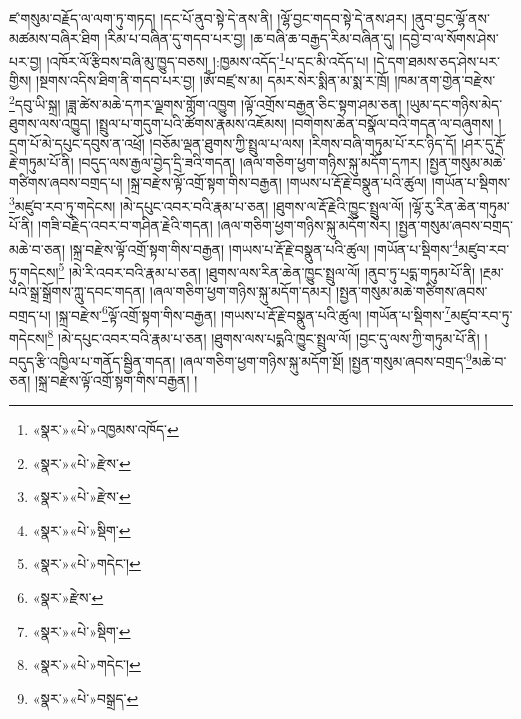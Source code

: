 ཛ་གསུམ་བརྗོད་ལ་ལག་ཏུ་གཏད། །དང་པོ་ནུབ་སྟེ་དེ་ནས་ནི། །ལྷོ་བྱང་གདབ་སྟེ་དེ་ནས་ཤར། །ནུབ་བྱང་ལྷོ་ནས་མཚམས་བཞིར་ཐིག །རིམ་པ་བཞིན་དུ་གདབ་པར་བྱ། །ཆ་བཞི་ཆ་བརྒྱད་རིམ་བཞིན་དུ། །དབྱེ་བ་ལ་སོགས་ཤེས་པར་བྱ། །འཁོར་ལོ་རྩིབས་བཞི་མུ་ཁྱུད་བཅས། །:ཁྱམས་འདོད་\footnote{«སྣར་»«པེ་»འཁྱམས་འཁོད་}པ་དང་མི་འདོད་པ། །དེ་དག་ཐམས་ཅད་ཤེས་པར་གྱིས། །སྔགས་འདིས་ཐིག་ནི་གདབ་པར་བྱ། །ཨོཾ་བཛྲ་ས་མ། དམར་སེར་སྨིན་མ་སྨ་ར་ཁྲོ། །ཁམ་ནག་གྱེན་བརྫེས་\footnote{«སྣར་»«པེ་»རྫེས་}དབུ་ཡི་སྐྲ། །ཟླ་ཚེས་མཆེ་དཀར་ལྗགས་གློག་འཁྱུག །ལྟོ་འགྲོས་བརྒྱན་ཅིང་སྟག་ཤམ་ཅན། །ཡུམ་དང་གཉིས་མེད་ཐུགས་ལས་འཁྱུད། །སྤྲུལ་པ་གདུག་པའི་ཚོགས་རྣམས་འཇོམས། །བགེགས་ཆེན་བསྣོལ་བའི་གདན་ལ་བཞུགས། །དྲག་པོ་མེ་དཔུང་དབུས་ན་འཕྲོ། །བཅོམ་ལྡན་ཐུགས་ཀྱི་སྤྲུལ་པ་ལས། །རིགས་བཞི་གཏུམ་པོ་རང་ཉིད་དོ། །ཤར་དུ་རྡོ་རྗེ་གཏུམ་པོ་ནི། །བདུད་ལས་རྒྱལ་བྱེད་དྲི་ཟའི་གདན། །ཞལ་གཅིག་ཕྱག་གཉིས་སྐུ་མདོག་དཀར། །སྤྱན་གསུམ་མཆེ་གཙིགས་ཞབས་བགྲད་པ། །སྐྲ་བརྫེས་ལྟོ་འགྲོ་སྟག་གིས་བརྒྱན། །གཡས་པ་རྡོ་རྗེ་བསྣུན་པའི་ཚུལ། །གཡོན་པ་སྡིགས་\footnote{«སྣར་»«པེ་»རྫེས་}མཛུབ་རབ་ཏུ་གདེངས། །མེ་དཔུང་འབར་བའི་རྣམ་པ་ཅན། །ཐུགས་ལ་རྡོ་རྗེའི་ཁྱུང་སྤྲུལ་ལོ། །ལྷོ་རུ་རིན་ཆེན་གཏུམ་པོ་ནི། །གཟི་བརྗིད་འབར་བ་གཤིན་རྗེའི་གདན། །ཞལ་གཅིག་ཕྱག་གཉིས་སྐུ་མདོག་སེར། །སྤྱན་གསུམ་ཞབས་བགྲད་མཆེ་བ་ཅན། །སྐྲ་བརྫེས་ལྟོ་འགྲོ་སྟག་གིས་བརྒྱན། །གཡས་པ་རྡོ་རྗེ་བསྣུན་པའི་ཚུལ། །གཡོན་པ་སྡིགས་\footnote{«སྣར་»«པེ་»སྡིག་}མཛུབ་རབ་ཏུ་གདེངས།\footnote{«སྣར་»«པེ་»གདེང་།} །མེ་རི་འབར་བའི་རྣམ་པ་ཅན། །ཐུགས་ལས་རིན་ཆེན་ཁྱུང་སྤྲུལ་ལོ། །ནུབ་ཏུ་པདྨ་གཏུམ་པོ་ནི། །རྔམ་པའི་སྒྲ་སྒྲོགས་ཀླུ་དབང་གདན། །ཞལ་གཅིག་ཕྱག་གཉིས་སྐུ་མདོག་དམར། །སྤྱན་གསུམ་མཆེ་གཙིགས་ཞབས་བགྲད་པ། །སྐྲ་བརྫེས་\footnote{«སྣར་»རྫེས་}ལྟོ་འགྲོ་སྟག་གིས་བརྒྱན། །གཡས་པ་རྡོ་རྗེ་བསྣུན་པའི་ཚུལ། །གཡོན་པ་སྡིགས་\footnote{«སྣར་»«པེ་»སྡིག་}མཛུབ་རབ་ཏུ་གདེངས།\footnote{«སྣར་»«པེ་»གདེང་།} །མེ་དཔུང་འབར་བའི་རྣམ་པ་ཅན། །ཐུགས་ལས་པདྨའི་ཁྱུང་སྤྲུལ་ལོ། །བྱང་དུ་ལས་ཀྱི་གཏུམ་པོ་ནི། །བདུད་རྩི་འཁྱིལ་པ་གནོད་སྦྱིན་གདན། །ཞལ་གཅིག་ཕྱག་གཉིས་སྐུ་མདོག་སྔོ། །སྤྱན་གསུམ་ཞབས་བགྲད་\footnote{«སྣར་»«པེ་»བསྒྲད་}མཆེ་བ་ཅན། །སྐྲ་བརྫེས་ལྟོ་འགྲོ་སྟག་གིས་བརྒྱན། །
